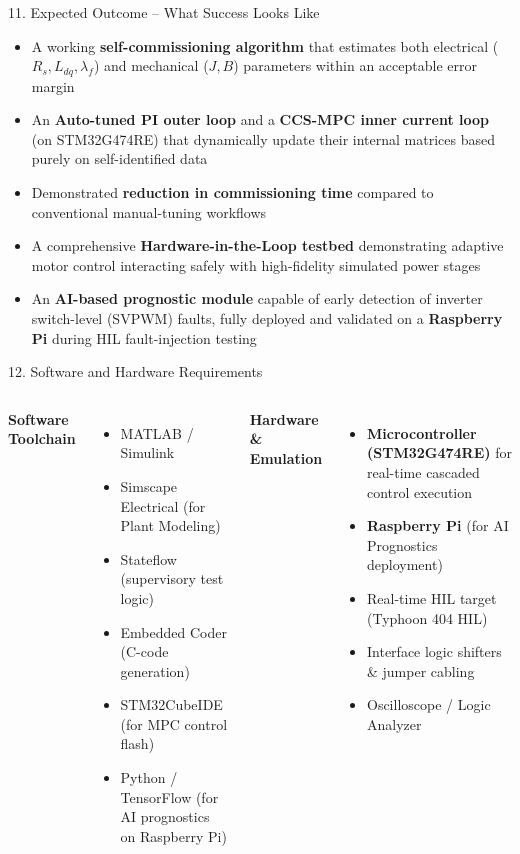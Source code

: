 \documentclass[aspectratio=169]{beamer}
\begin{document}
\begin{frame}{11. Expected Outcome -- What Success Looks Like}
    \begin{itemize}
        \item A working \textbf{self-commissioning algorithm} that estimates both electrical ($R_s, L_{dq}, \lambda_f$) and mechanical ($J, B$) parameters within an acceptable error margin
        \item An \textbf{Auto-tuned PI outer loop} and a \textbf{CCS-MPC inner current loop} (on STM32G474RE) that dynamically update their internal matrices based purely on self-identified data
        \item Demonstrated \textbf{reduction in commissioning time} compared to conventional manual-tuning workflows
        \item A comprehensive \textbf{Hardware-in-the-Loop testbed} demonstrating adaptive motor control interacting safely with high-fidelity simulated power stages
        \item An \textbf{AI-based prognostic module} capable of early detection of inverter switch-level (SVPWM) faults, fully deployed and validated on a \textbf{Raspberry Pi} during HIL fault-injection testing
    \end{itemize}
\end{frame}

\begin{frame}{12. Software and Hardware Requirements}
    \begin{columns}[T]
        \textbf{Software Toolchain}
        \begin{itemize}
            \footnotesize
            \item MATLAB / Simulink
            \item Simscape Electrical (for Plant Modeling)
            \item Stateflow (supervisory test logic)
            \item Embedded Coder (C-code generation)
            \item STM32CubeIDE (for MPC control flash)
            \item Python / TensorFlow (for AI prognostics on Raspberry Pi)
        \end{itemize}
        \textbf{Hardware \& Emulation}
        \begin{itemize}
            \footnotesize
            \item \textbf{Microcontroller (STM32G474RE)} for real-time cascaded control execution
            \item \textbf{Raspberry Pi} (for AI Prognostics deployment)
            \item Real-time HIL target (Typhoon 404 HIL)
            \item Interface logic shifters \& jumper cabling
            \item Oscilloscope / Logic Analyzer
        \end{itemize}
    \end{columns}
\end{frame}
\end{document}
